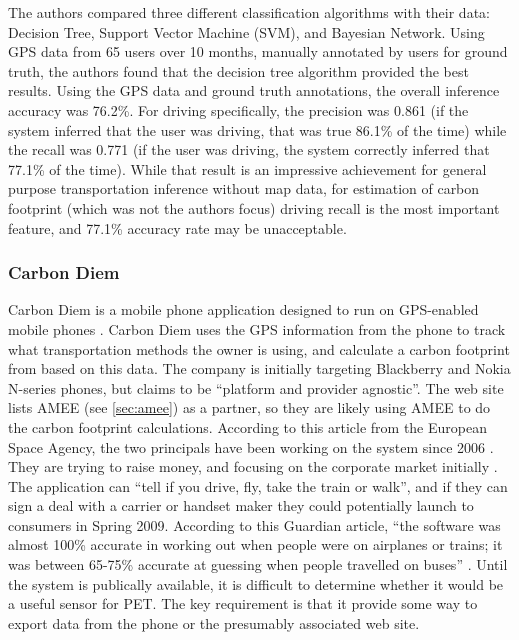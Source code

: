The authors compared three different classification algorithms with their data: Decision Tree, Support Vector Machine (SVM), and Bayesian Network. Using GPS data from 65 users over 10 months, manually annotated by users for ground truth, the authors found that the decision tree algorithm provided the best results. Using the GPS data and ground truth annotations, the overall inference accuracy was 76.2\%. For driving specifically, the precision was 0.861 (if the system inferred that the user was driving, that was true 86.1\% of the time) while the recall was 0.771 (if the user was driving, the system correctly inferred that 77.1\% of the time). While that result is an impressive achievement for general purpose transportation inference without map data, for estimation of carbon footprint (which was not the authors focus) driving recall is the most important feature, and 77.1\% accuracy rate may be unacceptable.

\subsubsection{Carbon Diem}
\label{sec:carbon-diem}

Carbon Diem is a mobile phone application designed to run on GPS-enabled mobile phones \cite{Carbon-Diem-website}. Carbon Diem uses the GPS information from the phone to track what transportation methods the owner is using, and calculate a carbon footprint from based on this data. The company is initially targeting Blackberry and Nokia N-series phones, but claims to be ``platform and provider agnostic''. The web site lists AMEE (see \autoref{sec:amee}) as a partner, so they are likely using AMEE to do the carbon footprint calculations. According to this article from the European Space Agency, the two principals have been working on the system since 2006 \cite{ESA-carbon-hero-2008}. They are trying to raise money, and focusing on the corporate market initially \cite{Fehrenbacher2008Carbon-Hero}. The application can ``tell if you drive, fly, take the train or walk'', and if they can sign a deal with a carrier or handset maker they could potentially launch to consumers in Spring 2009. According to this Guardian article, ``the software was almost 100\% accurate in working out when people were on airplanes or trains; it was between 65-75\% accurate at guessing when people travelled on buses'' \cite{Jha2008Carbon-Diem}. Until the system is publically available, it is difficult to determine whether it would be a useful sensor for PET. The key requirement is that it provide some way to export data from the phone or the presumably associated web site.

